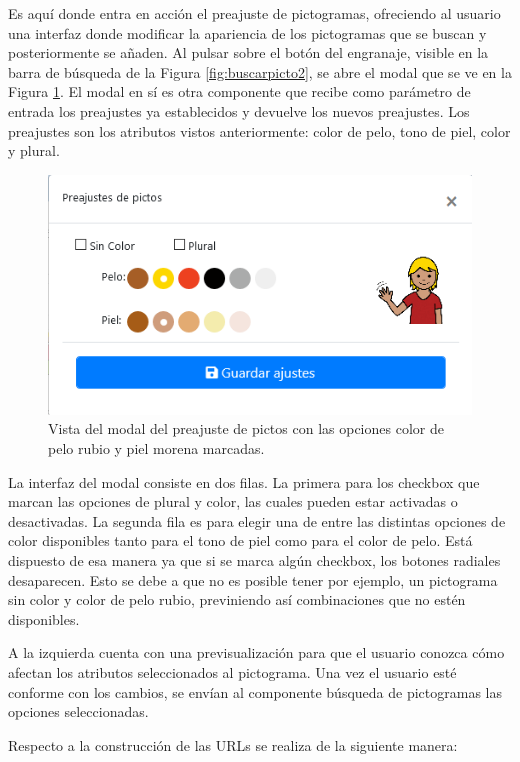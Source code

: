 Es aquí donde entra en acción el preajuste de pictogramas, ofreciendo al usuario una interfaz donde modificar la apariencia de los pictogramas que se buscan y posteriormente se añaden. Al pulsar sobre el botón del engranaje, visible en la barra de búsqueda de la Figura \ref{fig:buscarpicto2}, se abre el modal que se ve en la Figura \ref{fig:modalpreajustepicto}. El modal en sí es otra componente que recibe como parámetro de entrada los preajustes ya establecidos y devuelve los nuevos preajustes. Los preajustes son los atributos vistos anteriormente: color de pelo, tono de piel, color y plural.

\begin{figure}[h!]
	\centering
	\includegraphics[width=0.7\linewidth]{Imagenes/Bitmap/modalPreajustePicto}
	\caption{Vista del modal del preajuste de pictos con las opciones color de pelo rubio y piel morena marcadas.}
	\label{fig:modalpreajustepicto}
\end{figure}



La interfaz del modal consiste en dos filas. La primera para los checkbox que marcan las opciones de plural y color, las cuales pueden estar activadas o desactivadas. La segunda fila es para elegir una de entre las distintas opciones de color disponibles tanto para el tono de piel como para el color de pelo. Está dispuesto de esa manera ya que si se marca algún checkbox, los botones radiales desaparecen. Esto se debe a que no es posible tener por ejemplo, un pictograma sin color y color de pelo rubio, previniendo así combinaciones que no estén disponibles.

A la izquierda cuenta con una previsualización para que el usuario conozca cómo afectan los atributos seleccionados al pictograma. Una vez el usuario esté conforme con los cambios, se envían al componente búsqueda de pictogramas las opciones seleccionadas.

Respecto a la construcción de las URLs se realiza de la siguiente manera:

